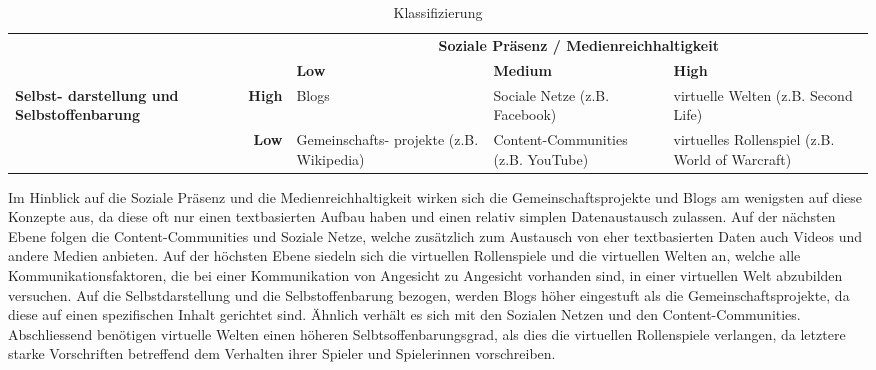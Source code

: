 \begin{table}[ht] \centering
	\caption{Klassifizierung}
	\begin{tabular}[t]{|m{27mm} r|m{28mm}|m{28mm}|m{35mm}|} \hline 
		\multicolumn{2}{|c|}{} & \multicolumn{3}{c|}{\textbf{Soziale Präsenz / Medienreichhaltigkeit}} \\
		\multicolumn{2}{|c|}{} & \cellcolor{gray} \textbf{Low} & \cellcolor{gray} \textbf{Medium} & \cellcolor{gray} \textbf{High} \\ 
			\hline 
		\multirow{2}{27mm}{\textbf{Selbst- darstellung und Selbstoffenbarung}} & \cellcolor{gray}\textbf{High} & Blogs & Sociale Netze (z.B. Facebook) & virtuelle Welten (z.B. Second Life) \\ 
			\cline{2-5}
		& \cellcolor{gray}\textbf{Low} & Gemeinschafts- projekte (z.B. Wikipedia) & Content-Communities (z.B. YouTube) & virtuelles Rollenspiel (z.B. World of Warcraft) \\ 
			\hline
	\end{tabular}
	\label{tab:Klassifiaktion}
\end{table}
 
Im Hinblick auf die Soziale Präsenz und die Medienreichhaltigkeit wirken sich die Gemeinschaftsprojekte und Blogs am wenigsten auf diese Konzepte aus, da diese oft nur einen textbasierten Aufbau haben und einen relativ simplen Datenaustausch zulassen. Auf der nächsten Ebene folgen die Content-Communities und Soziale Netze, welche zusätzlich zum Austausch von eher textbasierten Daten auch Videos und andere Medien anbieten. Auf der höchsten Ebene siedeln sich die virtuellen Rollenspiele und die virtuellen Welten an, welche alle Kommunikationsfaktoren, die bei einer Kommunikation von Angesicht zu Angesicht vorhanden sind, in einer virtuellen Welt abzubilden versuchen. \newline 
Auf die Selbstdarstellung und die Selbstoffenbarung bezogen, werden Blogs höher eingestuft als die Gemeinschaftsprojekte, da diese auf einen spezifischen Inhalt gerichtet sind. Ähnlich verhält es sich mit den Sozialen Netzen und den Content-Communities. Abschliessend benötigen virtuelle Welten einen höheren Selbtsoffenbarungsgrad, als dies die virtuellen Rollenspiele verlangen, da letztere starke Vorschriften betreffend dem Verhalten ihrer Spieler und Spielerinnen vorschreiben.

